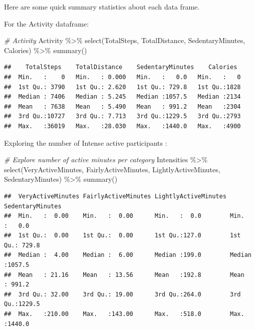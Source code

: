 \documentclass[
]{article}
\newenvironment{Shaded}{\begin{snugshade}}{\end{snugshade}}
\newcommand{\CommentTok}[1]{\textcolor[rgb]{0.56,0.35,0.01}{\textit{#1}}}
\newcommand{\FunctionTok}[1]{\textcolor[rgb]{0.00,0.00,0.00}{#1}}
\newcommand{\NormalTok}[1]{#1}
\newcommand{\SpecialCharTok}[1]{\textcolor[rgb]{0.00,0.00,0.00}{#1}}
\begin{document}
Here are some quick summary statistics about each data frame.

For the Activity dataframe:

\begin{Shaded}
\begin{Highlighting}[]
\CommentTok{\# Activity}
\NormalTok{Activity }\SpecialCharTok{\%\textgreater{}\%}  
  \FunctionTok{select}\NormalTok{(TotalSteps,}
\NormalTok{         TotalDistance,}
\NormalTok{         SedentaryMinutes, Calories) }\SpecialCharTok{\%\textgreater{}\%}
  \FunctionTok{summary}\NormalTok{()}
\end{Highlighting}
\end{Shaded}

\begin{verbatim}
##    TotalSteps    TotalDistance    SedentaryMinutes    Calories   
##  Min.   :    0   Min.   : 0.000   Min.   :   0.0   Min.   :   0  
##  1st Qu.: 3790   1st Qu.: 2.620   1st Qu.: 729.8   1st Qu.:1828  
##  Median : 7406   Median : 5.245   Median :1057.5   Median :2134  
##  Mean   : 7638   Mean   : 5.490   Mean   : 991.2   Mean   :2304  
##  3rd Qu.:10727   3rd Qu.: 7.713   3rd Qu.:1229.5   3rd Qu.:2793  
##  Max.   :36019   Max.   :28.030   Max.   :1440.0   Max.   :4900
\end{verbatim}

Exploring the number of Intense active participants :

\begin{Shaded}
\begin{Highlighting}[]
\CommentTok{\# Explore number of active minutes per category}
\NormalTok{Intensities }\SpecialCharTok{\%\textgreater{}\%}
  \FunctionTok{select}\NormalTok{(VeryActiveMinutes, FairlyActiveMinutes, LightlyActiveMinutes, SedentaryMinutes) }\SpecialCharTok{\%\textgreater{}\%}
  \FunctionTok{summary}\NormalTok{()}
\end{Highlighting}
\end{Shaded}

\begin{verbatim}
##  VeryActiveMinutes FairlyActiveMinutes LightlyActiveMinutes SedentaryMinutes
##  Min.   :  0.00    Min.   :  0.00      Min.   :  0.0        Min.   :   0.0  
##  1st Qu.:  0.00    1st Qu.:  0.00      1st Qu.:127.0        1st Qu.: 729.8  
##  Median :  4.00    Median :  6.00      Median :199.0        Median :1057.5  
##  Mean   : 21.16    Mean   : 13.56      Mean   :192.8        Mean   : 991.2  
##  3rd Qu.: 32.00    3rd Qu.: 19.00      3rd Qu.:264.0        3rd Qu.:1229.5  
##  Max.   :210.00    Max.   :143.00      Max.   :518.0        Max.   :1440.0
\end{verbatim}
\end{document}

